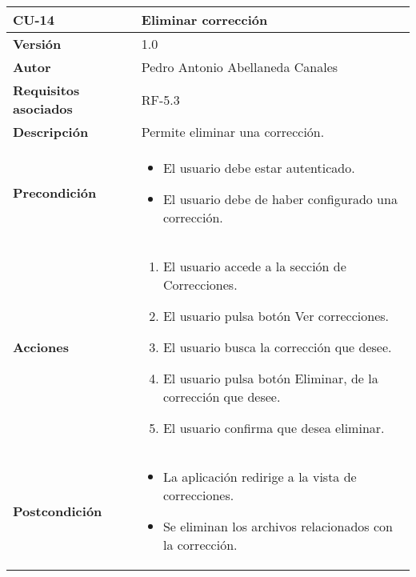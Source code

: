 \begin{table}[p]
	\centering
	\begin{tabularx}{\linewidth}{ p{} p{} }
		\toprule
		\textbf{CU-14}    & \textbf{Eliminar corrección} \\
		\midrule
		\textbf{Versión}              & 1.0    \\
		\textbf{Autor}                & Pedro Antonio Abellaneda Canales \\
		\textbf{Requisitos asociados} & RF-5.3 \\
		\textbf{Descripción}          & Permite eliminar una corrección. \\
		\textbf{Precondición}         & \begin{itemize}
                                        \tightlist
		                                  \item El usuario debe estar autenticado.
		                                  \item El usuario debe de haber configurado una corrección.
		                                 \end{itemize} \\
		\textbf{Acciones}             &
                            		\begin{enumerate}
                            			\def\labelenumi{\arabic{enumi}.}
                            			\tightlist
                            			\item El usuario accede a la sección de Correcciones.
                                        \item El usuario pulsa botón Ver correcciones.
                                        \item El usuario busca la corrección que desee.
                                        \item El usuario pulsa botón Eliminar, de la corrección que desee.
                                        \item El usuario confirma que desea eliminar.
                            		\end{enumerate} \\
		\textbf{Postcondición}        & \begin{itemize}
                                        \tightlist
		                                  \item La aplicación redirige a la vista de correcciones.
		                                  \item Se eliminan los archivos relacionados con la corrección.

\end{itemize}
\end{tabularx}
\end{table}
